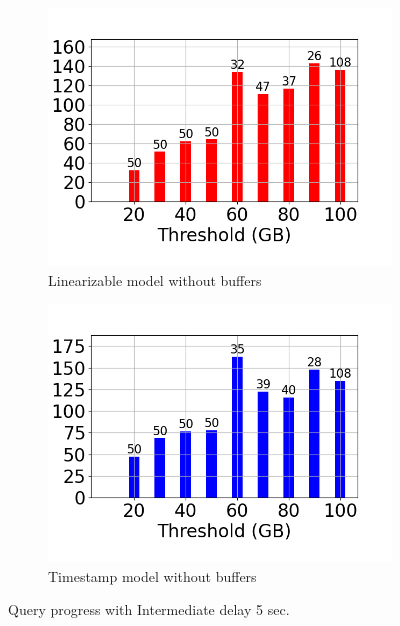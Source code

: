 \begin{figure}
\begin{subfigure}[c]{0.48\textwidth}
		\label{fig:progress-queries-5-system}
	\end{subfigure}
	\begin{subfigure}[c]{0.48\textwidth}
		\includegraphics[width=1\textwidth]   {figures/Experiments/Dynamic/Progress/5/average_query_time_per_batch_version_999777016_10485760_10_delay[5].png}
		\caption{Linearizable model without buffers}
		\label{fig:progress-queries-5-logical-no-buffers}
	\end{subfigure}
	\begin{subfigure}[c]{0.48\textwidth}
		\includegraphics[width=1\textwidth]   {figures/Experiments/Dynamic/Progress/5/average_query_time_per_batch_version_999777017_10485760_10_delay[5].png}
		\caption{Timestamp model without buffers}
		\label{fig:progress-queries-5-system-no-buffers}
	\end{subfigure}
	\caption{Query progress with Intermediate delay 5 sec.}
	\label{fig:query-progress-delay-5}

\end{figure}


